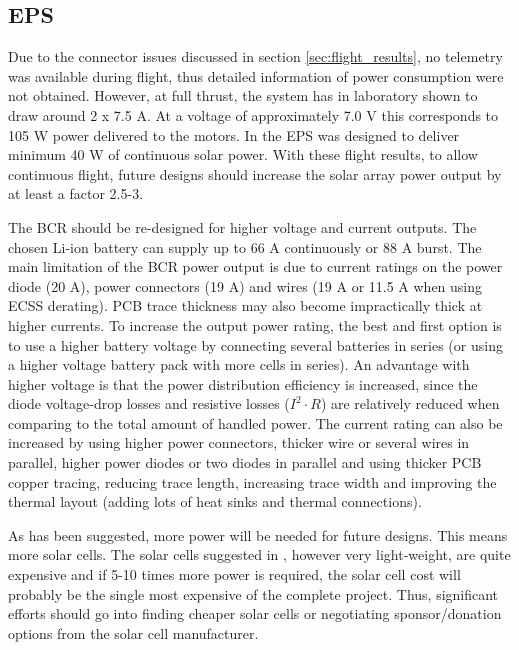 \subsection{EPS}
Due to the connector issues discussed in section \ref{sec:flight_results}, no telemetry was available during flight, thus detailed information of power consumption were not obtained. However, at full thrust, the system has in laboratory shown to draw around 2 x 7.5 A. At a voltage of approximately 7.0 V this corresponds to 105 W power delivered to the motors. In \cite{CDR} the \ac{EPS} was designed to deliver minimum 40 W of continuous solar power. With these flight results, to allow continuous flight, future designs should increase the solar array power output by at least a factor 2.5-3.
 
The \ac{BCR} should be re-designed for higher voltage and current outputs. The chosen Li-ion battery can supply up to 66 A continuously or 88 A burst. The main limitation of the \ac{BCR} power output is due to current ratings on the power diode (20 A), power connectors (19 A) and wires (19 A or 11.5 A when using ECSS derating\cite{ECSS_derating}). PCB trace thickness may also become impractically thick at higher currents. 
To increase the output power rating, the best and first option is to use a higher battery voltage by connecting several batteries in series (or using a higher voltage battery pack with more cells in series). An advantage with higher voltage is that the power distribution efficiency is increased, since the diode voltage-drop losses and resistive losses ($I^2 \cdot R$) are relatively reduced when comparing to the total amount of handled power. 
The current rating can also be increased by using higher power connectors, thicker wire or several wires in parallel, higher power diodes or two diodes in parallel and using thicker PCB copper tracing, reducing trace length, increasing trace width and improving the thermal layout (adding lots of heat sinks and thermal connections). 

As has been suggested, more power will be needed for future designs. This means more solar cells. The solar cells suggested in \cite{CDR}, however very light-weight, are quite expensive and if 5-10 times more power is required, the solar cell cost will probably be the single most expensive of the complete project. Thus, significant efforts should go into finding cheaper solar cells or negotiating sponsor/donation options from the solar cell manufacturer. 

%
